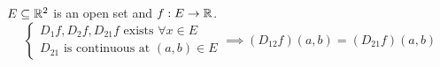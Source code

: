     \begin{theo}
        $E \subseteq \mathbb{R}^2$ is an open set and $f: E \to \mathbb{R}$.
        \begin{equation}
            \begin{cases}
                D_1 f, D_2 f, D_{21}f \text{ exists } \forall x \in E \\
                D_{21} \text{ is continuous at } (a,b) \in E
            \end{cases}
            \implies (D_{12}f)(a,b) = (D_{21}f)(a,b)
        \end{equation}
    \end{theo}